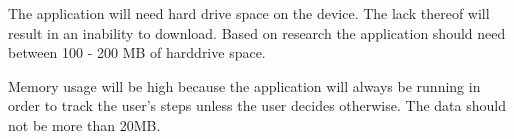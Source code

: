 \documentclass[11pt]{article}
\begin{document}
		The application will need hard drive space on the device. The lack thereof will result in an inability to download. 			Based on research the application should need between 100 - 200 MB of harddrive space. 

		Memory usage will be high because the application will always be running in order to track the user’s steps unless the 			user decides otherwise. The data should not be more than 20MB.


	
	
\end{document}
